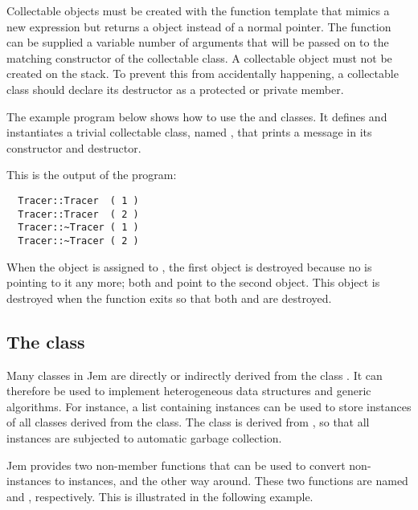 Collectable objects must be created with the function template
 that mimics a new expression but returns a 
object instead of a normal pointer. The  function can
be supplied a variable number of arguments that will be passed on to the
matching constructor of the collectable class. A collectable object must
not be created on the stack. To prevent this from accidentally happening,
a collectable class should declare its destructor as a protected or
private member.

The example program below shows how to use the  and
 classes. It defines and instantiates a trivial collectable
class, named , that prints a message in its constructor and
destructor.


This is the output of the program:

\begin{Verbatim}
  Tracer::Tracer  ( 1 )
  Tracer::Tracer  ( 2 )
  Tracer::~Tracer ( 1 )
  Tracer::~Tracer ( 2 )
\end{Verbatim}

When the  object  is assigned to , the first
 object is destroyed because no  is pointing to it
any more; both  and  point to the second 
object. This object is destroyed when the function  exits so
that both  and  are destroyed.


\subsection*{The  class}

Many classes in Jem are directly or indirectly derived from the class
. It can therefore be used to implement heterogeneous
data structures and generic algorithms. For instance, a list
containing  instances can be used to store instances of
all classes derived from the  class. The 
class is derived from , so that all 
instances are subjected to automatic garbage collection.

Jem provides two non-member functions that can be used to convert
non- instances to  instances, and the other way
around. These two functions are named  and
, respectively. This is illustrated in the following
example.

